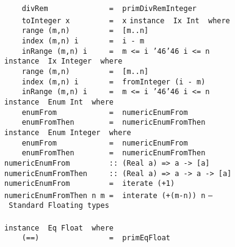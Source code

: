 \mbox{\tt \ \ \ \ divRem\ \ \ \ \ \ \ \ \ \ \ \ \ \ =\ \ primDivRemInteger}\\
\mbox{\tt \ \ \ \ toInteger\ x\ \ \ \ \ \ \ \ \ =\ \ x}
%
\eprogB\noindent\bprogB
\mbox{\tt instance\ \ Ix\ Int\ \ where}\\
\mbox{\tt \ \ \ \ range\ (m,n)\ \ \ \ \ \ \ \ \ =\ \ [m..n]}\\
\mbox{\tt \ \ \ \ index\ (m,n)\ i\ \ \ \ \ \ \ =\ \ i\ -\ m}\\
\mbox{\tt \ \ \ \ inRange\ (m,n)\ i\ \ \ \ \ =\ \ m\ <=\ i\ {\char'46}{\char'46}\ i\ <=\ n}
%
\eprogB\noindent\bprogB
\mbox{\tt instance\ \ Ix\ Integer\ \ where}\\
\mbox{\tt \ \ \ \ range\ (m,n)\ \ \ \ \ \ \ \ \ =\ \ [m..n]}\\
\mbox{\tt \ \ \ \ index\ (m,n)\ i\ \ \ \ \ \ \ =\ \ fromInteger\ (i\ -\ m)}\\
\mbox{\tt \ \ \ \ inRange\ (m,n)\ i\ \ \ \ \ =\ \ m\ <=\ i\ {\char'46}{\char'46}\ i\ <=\ n}
%
\eprogB\noindent\bprogB
\mbox{\tt instance\ \ Enum\ Int\ \ where}\\
\mbox{\tt \ \ \ \ enumFrom\ \ \ \ \ \ \ \ \ \ \ \ =\ \ numericEnumFrom}\\
\mbox{\tt \ \ \ \ enumFromThen\ \ \ \ \ \ \ \ =\ \ numericEnumFromThen}
%
\eprogB\noindent\bprogB
\mbox{\tt instance\ \ Enum\ Integer\ \ where}\\
\mbox{\tt \ \ \ \ enumFrom\ \ \ \ \ \ \ \ \ \ \ \ =\ \ numericEnumFrom}\\
\mbox{\tt \ \ \ \ enumFromThen\ \ \ \ \ \ \ \ =\ \ numericEnumFromThen}
%
\eprogB\noindent\bprogB
\mbox{\tt numericEnumFrom\ \ \ \ \ \ \ \ \ ::\ (Real\ a)\ =>\ a\ ->\ [a]}\\
\mbox{\tt numericEnumFromThen\ \ \ \ \ ::\ (Real\ a)\ =>\ a\ ->\ a\ ->\ [a]}\\
\mbox{\tt numericEnumFrom\ \ \ \ \ \ \ \ \ =\ \ iterate\ (+1)}\\
\mbox{\tt numericEnumFromThen\ n\ m\ =\ \ interate\ (+(m-n))\ n}
%
%
\eprogB\noindent\bprogB
\mbox{\tt --\ Standard\ Floating\ types}\\
\mbox{\tt }\\[-8pt]
\mbox{\tt instance\ \ Eq\ Float\ \ where}\\
\mbox{\tt \ \ \ \ (==)\ \ \ \ \ \ \ \ \ \ \ \ \ \ \ \ =\ \ primEqFloat}
